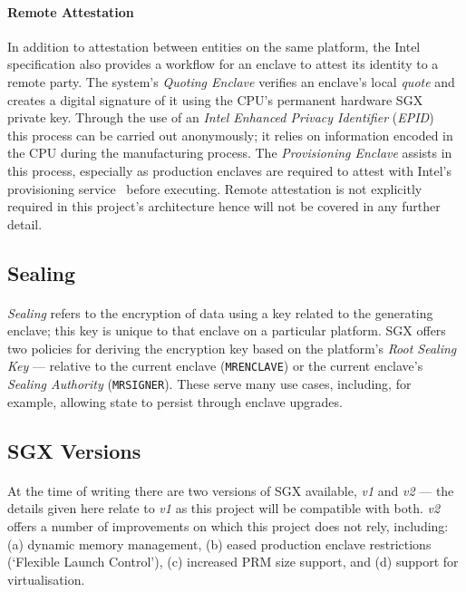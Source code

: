 \paragraph{Remote Attestation} In addition to attestation between entities on the same platform, the Intel specification also provides a workflow for an enclave to attest its identity to a remote party. The system's \textit{Quoting Enclave} verifies an enclave's local \textit{quote} and creates a digital signature of it using the CPU's permanent hardware SGX private key. Through the use of an \textit{Intel Enhanced Privacy Identifier} (\textit{EPID})~\cite{epid} this process can be carried out anonymously; it relies on information encoded in the CPU during the manufacturing process. The \textit{Provisioning Enclave} assists in this process, especially as production enclaves are required to attest with Intel's provisioning service~\cite{sgx-prov-service} before executing. Remote attestation is not explicitly required in this project's architecture hence will not be covered in any further detail.

\subsection{Sealing}
\label{sec:sealing}
\paragraph{} \textit{Sealing} refers to the encryption of data using a key related to the generating enclave; this key is unique to that enclave on a particular platform. SGX offers two policies for deriving the encryption key based on the platform's \textit{Root Sealing Key} --- relative to the current enclave (\texttt{MRENCLAVE}) or the current enclave's \textit{Sealing Authority} (\texttt{MRSIGNER}). These serve many use cases, including, for example, allowing state to persist through enclave upgrades.

\subsection{SGX Versions}
\label{sec:sgx-versions}
\paragraph{} At the time of writing there are two versions of SGX available, \textit{v1} and \textit{v2} --- the details given here relate to \textit{v1} as this project will be compatible with both. \textit{v2} offers a number of improvements on which this project does not rely, including: (a) dynamic memory management, (b) eased production enclave restrictions (`Flexible Launch Control'), (c) increased PRM size support, and (d) support for virtualisation.


